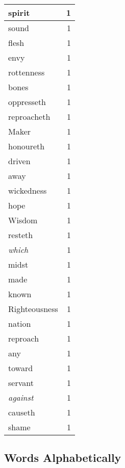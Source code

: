 \begin{center}
\begin{longtable}{l|r}
spirit & 1\\ \hline 
sound & 1\\ \hline 
flesh & 1\\ \hline 
envy & 1\\ \hline 
rottenness & 1\\ \hline 
bones & 1\\ \hline 
oppresseth & 1\\ \hline 
reproacheth & 1\\ \hline 
Maker & 1\\ \hline 
honoureth & 1\\ \hline 
driven & 1\\ \hline 
away & 1\\ \hline 
wickedness & 1\\ \hline 
hope & 1\\ \hline 
Wisdom & 1\\ \hline 
resteth & 1\\ \hline 
\emph{which} & 1\\ \hline 
midst & 1\\ \hline 
made & 1\\ \hline 
known & 1\\ \hline 
Righteousness & 1\\ \hline 
nation & 1\\ \hline 
reproach & 1\\ \hline 
any & 1\\ \hline 
toward & 1\\ \hline 
servant & 1\\ \hline 
\emph{against} & 1\\ \hline 
causeth & 1\\ \hline 
shame & 1\\ \hline 
\end{longtable}  
\end{center}  


  
  

  
  


\subsection{Words Alphabetically}

